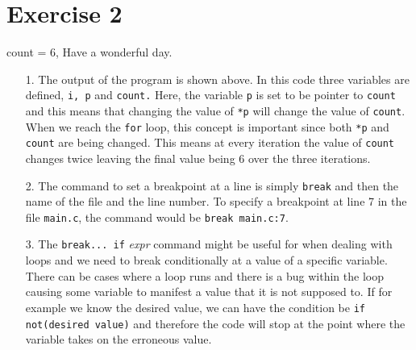 \documentclass[12pt]{article}
\begin{document}
    \section*{Exercise 2}
    \begin{center}
                        count = 6, Have a wonderful day.
    \end{center}
    \begin{itemize}
        \item[1.]
            The output of the program is shown above. In this code three
            variables are defined, \verb+i, p+ and \verb+count.+ Here, the
            variable \verb+p+ is set to be pointer to \verb+count+ and this
            means that changing the value of \verb+*p+ will change the value of
            \verb+count+. When we reach the \verb+for+ loop, this concept is
            important since both \verb+*p+ and \verb+count+ are being changed.
            This means at every iteration the value of \verb+count+ changes
            twice leaving the final value being 6 over the three iterations.
        \item[2.]
            The command to set a breakpoint at a line is simply \verb+break+ and
            then the name of the file and the line number. To specify a
            breakpoint at line 7 in the file \verb+main.c+, the command would be
            \verb+break main.c:7+.
        \item[3.]
            The \verb+break... if+ \textit{expr} command might be useful for
            when dealing with loops and we need to break conditionally at a
            value of a specific variable. There can be cases where a loop runs
            and there is a bug within the loop causing some variable to manifest
            a value that it is not supposed to. If for example we know the
            desired value, we can have the condition be \verb+if not(desired value)+
            and therefore the code will stop at the point where the variable
            takes on the erroneous value.
    \end{itemize}
\end{document}
